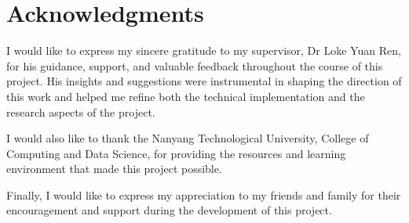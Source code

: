 \chapter*{Acknowledgments}

I would like to express my sincere gratitude to my supervisor, Dr Loke Yuan Ren, for his guidance, support, and valuable feedback throughout the course of this project. His insights and suggestions were instrumental in shaping the direction of this work and helped me refine both the technical implementation and the research aspects of the project.

I would also like to thank the Nanyang Technological University, College of Computing and Data Science, for providing the resources and learning environment that made this project possible.

Finally, I would like to express my appreciation to my friends and family for their encouragement and support during the development of this project.


